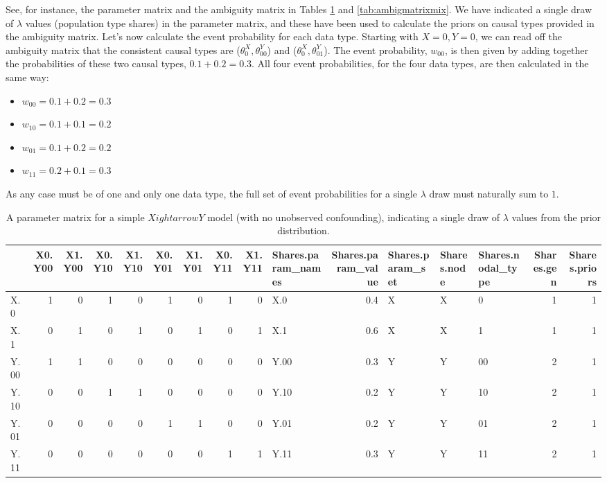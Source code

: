 \documentclass[
  12pt,
]{book}
\providecommand{\tightlist}{%
  \setlength{\itemsep}{0pt}\setlength{\parskip}{0pt}}
\begin{document}
See, for instance, the parameter matrix and the ambiguity matrix in Tables \ref{tab:parammmatrixmix} and \ref{tab:ambigmatrixmix}. We have indicated a single draw of \(\lambda\) values (population type shares) in the parameter matrix, and these have been used to calculate the priors on causal types provided in the ambiguity matrix. Let's now calculate the event probability for each data type. Starting with \(X=0, Y=0\), we can read off the ambiguity matrix that the consistent causal types are (\(\theta^X_0, \theta^Y_{00}\)) and (\(\theta^X_0, \theta^Y_{01}\)). The event probability, \(w_{00}\), is then given by adding together the probabilities of these two causal types, \(0.1 + 0.2 = 0.3\). All four event probabilities, for the four data types, are then calculated in the same way:

\begin{itemize}
\tightlist
\item
  \(w_{00} = 0.1 + 0.2 = 0.3\)
\item
  \(w_{10} = 0.1 + 0.1 = 0.2\)
\item
  \(w_{01} = 0.1 + 0.2 = 0.2\)
\item
  \(w_{11} = 0.2 + 0.1 = 0.3\)
\end{itemize}

As any case must be of one and only one data type, the full set of event probabilities for a single \(\lambda\) draw must naturally sum to \(1\).

\begin{table}

\caption{\label{tab:parammmatrixmix}A parameter matrix for a simple $X ightarrow Y$ model (with no unobserved confounding), indicating a single draw of $\lambda$ values from the prior distribution.}
\centering
\begin{tabular}[t]{l|r|r|r|r|r|r|r|r|l|r|l|l|l|r|r}
\hline
  & X0.Y00 & X1.Y00 & X0.Y10 & X1.Y10 & X0.Y01 & X1.Y01 & X0.Y11 & X1.Y11 & Shares.param\_names & Shares.param\_value & Shares.param\_set & Shares.node & Shares.nodal\_type & Shares.gen & Shares.priors\\
\hline
X.0 & 1 & 0 & 1 & 0 & 1 & 0 & 1 & 0 & X.0 & 0.4 & X & X & 0 & 1 & 1\\
\hline
X.1 & 0 & 1 & 0 & 1 & 0 & 1 & 0 & 1 & X.1 & 0.6 & X & X & 1 & 1 & 1\\
\hline
Y.00 & 1 & 1 & 0 & 0 & 0 & 0 & 0 & 0 & Y.00 & 0.3 & Y & Y & 00 & 2 & 1\\
\hline
Y.10 & 0 & 0 & 1 & 1 & 0 & 0 & 0 & 0 & Y.10 & 0.2 & Y & Y & 10 & 2 & 1\\
\hline
Y.01 & 0 & 0 & 0 & 0 & 1 & 1 & 0 & 0 & Y.01 & 0.2 & Y & Y & 01 & 2 & 1\\
\hline
Y.11 & 0 & 0 & 0 & 0 & 0 & 0 & 1 & 1 & Y.11 & 0.3 & Y & Y & 11 & 2 & 1\\
\hline
\end{tabular}
\end{table}
\end{document}
